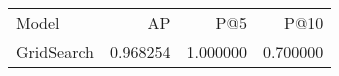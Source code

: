 \begin{tabular}{lrrr}
Model & AP & P@5 & P@10 \\
GridSearch & 0.968254 & 1.000000 & 0.700000 \\
\end{tabular}
